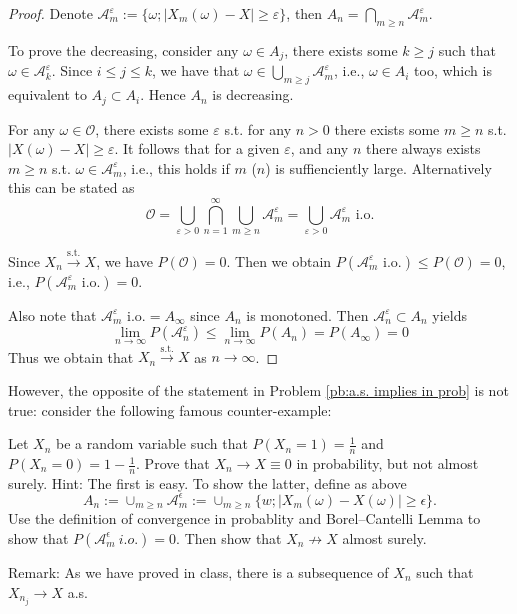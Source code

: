     \begin{proof}
        Denote $\mathcal A_m^\varepsilon:=\{\omega;|X_m(\omega)-X|\geq\varepsilon\}$,
        then $A_n=\bigcap_{m\geq n}\mathcal A_m^\varepsilon$.

        To prove the decreasing, consider any $\omega\in A_j$,
        there exists some $k\geq j$ such that $\omega\in\mathcal A_k^\varepsilon$.
        Since $i\leq j\leq k$, we have that $\omega\in\bigcup_{m\geq j}\mathcal A_m^\varepsilon$,
        i.e., $\omega\in A_i$ too, which is equivalent to $A_j\subset A_i$. Hence
        $A_n$ is decreasing.

        For any $\omega\in\mathcal O$, there exists some $\varepsilon$ s.t.
        for any $n>0$ there exists some $m\geq n$ s.t. $|X(\omega)-X|\geq\varepsilon$.
        It follows that for a given $\varepsilon$, and any $n$ there always
        exists $m\geq n$ s.t. $\omega\in\mathcal A_m^\varepsilon$, i.e.,
        this holds if $m$ ($n$) is suffienciently large.
        Alternatively this can be stated as
        \[\mathcal O=\bigcup_{\varepsilon>0}\bigcap_{n=1}^\infty
        \bigcup_{m\geq n}\mathcal A_m^\varepsilon
        =\bigcup_{\varepsilon>0}\mathcal A_m^\varepsilon\text{ i.o.}\]

        Since $X_n\xrightarrow{\mathrm{s.t.}}X$, we have $P(\mathcal O)=0$.
        Then we obtain $P(\mathcal A_m^\varepsilon\text{ i.o.})\leq
        P(\mathcal{O})=0$, i.e., $P(\mathcal A_m^\varepsilon\text{ i.o.})=0$.
        
        Also note that $\mathcal A_m^\varepsilon\text{ i.o.}=A_\infty$ since
        $A_n$ is monotoned. Then $\mathcal A_n^\varepsilon
        \subset A_n$ yields
        \[\lim_{n\to\infty}P(\mathcal A_n^\varepsilon)
        \leq\lim_{n\to\infty}P(A_n)=P(A_\infty)=0\]
        Thus we obtain that $X_n\xrightarrow{\mathrm{s.t.}}X$ as
        $n\to\infty$.
    \end{proof}

\problem
\begin{question}
    However, the opposite of the statement in Problem \ref{pb:a.s. implies in prob}
    is not true:  consider the following
    famous counter-example:

    Let $X_n$ be a random variable such that $P(X_n=1)=\frac{1}{n}$
    and $P(X_n=0)=1-\frac{1}{n}$.  Prove that $X_n\rightarrow X\equiv 0$
    in probability, but not almost surely.  Hint: The first is easy. 
    To show the latter, define as above
    \[A_n:=\cup_{m\geq n} \mathcal A^\epsilon_{m}:=\cup_{m\geq n}  \{w;|X_m(\omega)-X(\omega)|\geq \epsilon\}.\]
    Use the definition of convergence in probablity and Borel--Cantelli Lemma
    to show that $P(\mathcal A^\epsilon_{m}~i.o.)=0$.
    Then show that $X_n\not \rightarrow X$ almost surely.

    Remark: As we have proved in class, there is a subsequence of $X_n$
    such that $X_{n_j}\rightarrow X$ a.s.
\end{question}
